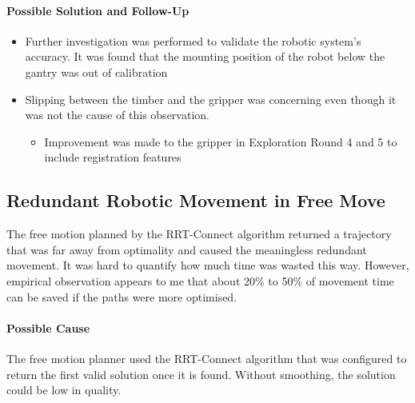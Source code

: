 \paragraph{Possible Solution and Follow-Up}

\begin{itemize}
    \item Further investigation was performed to validate the robotic system's accuracy. It was found that the mounting position of the robot below the gantry was out of calibration 
    \item Slipping between the timber and the gripper was concerning even though it was not the cause of this observation. 
    \begin{itemize}
        \item Improvement was made to the gripper in Exploration Round 4 and 5 to include registration features 
    \end{itemize}
\end{itemize}


\subsection{Redundant Robotic Movement in Free Move}
\label{subsection:exploration-2-redundant-robotic-movement-in-free-move}

The free motion planned by the RRT-Connect algorithm returned a trajectory that was far away from optimality and caused the meaningless redundant movement. It was hard to quantify how much time was wasted this way. However, empirical observation appears to me that about 20\% to 50\% of movement time can be saved if the paths were more optimised.

\paragraph{Possible Cause}

The free motion planner used the RRT-Connect algorithm that was configured to return the first valid solution once it is found. Without smoothing, the solution could be low in quality.

